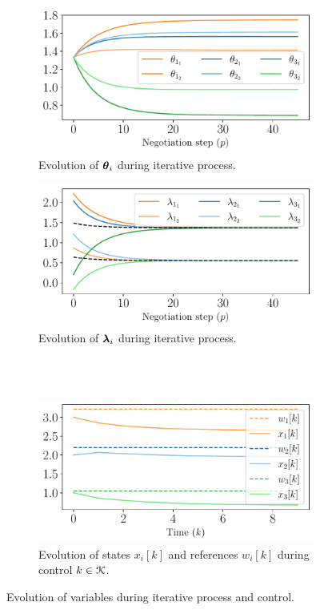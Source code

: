 \documentclass[../main.tex]{subfiles}
\begin{document}
\begin{figure}[h]
  \centering
  \begin{subfigure}{0.45\textwidth}
    \includegraphics[width=\textwidth]{../img/example_primal_decomposition/example_theta.pdf}
    \caption{Evolution of $\boldsymbol{\theta}_i$ during iterative process.}\label{fig:example_theta}
  \end{subfigure}
  \hfill
  \begin{subfigure}{0.45\textwidth}
    \centering
    \includegraphics[width=\textwidth]{../img/example_primal_decomposition/example_lambda.pdf}
    \caption{Evolution of $\boldsymbol{\lambda}_i$ during iterative process.}\label{fig:example_lambda}
  \end{subfigure}
  \\~\\
  \begin{subfigure}{0.45\textwidth}
    \centering
    \includegraphics[width=\textwidth]{../img/example_primal_decomposition/example_state.pdf}
    \caption{Evolution of states $x_{i}[k]$ and references $w_{i}[k]$ during control ${k\in\mathcal{K}}$.}\label{fig:example_state}
  \end{subfigure}
    \caption{Evolution of variables during iterative process and control.}\label{fig:example_variables}
\end{figure}
\end{document}
